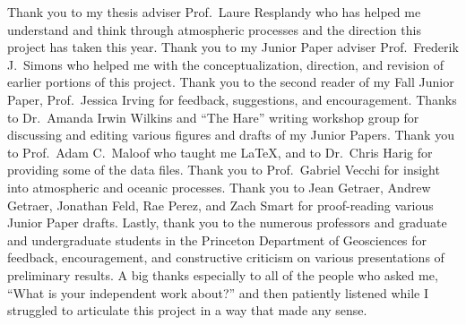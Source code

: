 
Thank you to my thesis adviser Prof.~Laure Resplandy who has helped me understand and think through atmospheric processes and the direction this project has taken this year.
Thank you to my Junior Paper adviser Prof.~Frederik J.~Simons who helped me with
the conceptualization, direction, and revision of earlier portions of this project. Thank you to the second reader of my Fall Junior Paper, Prof.~Jessica Irving for feedback, suggestions, and encouragement. Thanks to Dr.~Amanda
Irwin Wilkins and ``The Hare'' writing workshop group for discussing
and editing various figures and drafts of my Junior Papers. Thank you to Prof.~Adam C.~Maloof who taught me \LaTeX, and to Dr.~Chris Harig for providing some of the data files. Thank you to Prof.~Gabriel Vecchi for insight into atmospheric and oceanic processes. Thank you to Jean Getraer, Andrew Getraer, Jonathan Feld, Rae Perez, and Zach Smart for proof-reading various Junior Paper drafts.  Lastly, thank you to the numerous professors and graduate and undergraduate students in the Princeton Department of Geosciences for feedback, encouragement, and constructive criticism on various presentations of preliminary results. A big thanks especially to all of the people who asked me, ``What is your independent work about?'' and then patiently listened while I struggled to articulate this project in a way that made any sense.
